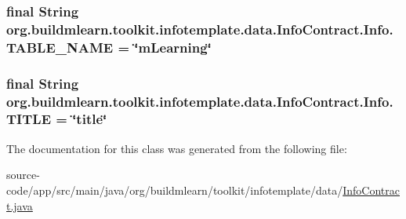 \subsubsection[{\texorpdfstring{T\+A\+B\+L\+E\+\_\+\+N\+A\+ME}{TABLE_NAME}}]{\setlength{\rightskip}{0pt plus 5cm}final String org.\+buildmlearn.\+toolkit.\+infotemplate.\+data.\+Info\+Contract.\+Info.\+T\+A\+B\+L\+E\+\_\+\+N\+A\+ME = \char`\"{}m\+Learning\char`\"{}\hspace{0.3cm}{\ttfamily [static]}}\hypertarget{classorg_1_1buildmlearn_1_1toolkit_1_1infotemplate_1_1data_1_1InfoContract_1_1Info_a5a7117b4841ab918cb9bbd92b3ce8e09}{}\label{classorg_1_1buildmlearn_1_1toolkit_1_1infotemplate_1_1data_1_1InfoContract_1_1Info_a5a7117b4841ab918cb9bbd92b3ce8e09}
\subsubsection[{\texorpdfstring{T\+I\+T\+LE}{TITLE}}]{\setlength{\rightskip}{0pt plus 5cm}final String org.\+buildmlearn.\+toolkit.\+infotemplate.\+data.\+Info\+Contract.\+Info.\+T\+I\+T\+LE = \char`\"{}title\char`\"{}\hspace{0.3cm}{\ttfamily [static]}}\hypertarget{classorg_1_1buildmlearn_1_1toolkit_1_1infotemplate_1_1data_1_1InfoContract_1_1Info_a1fe7ada37ca14f0968fba9d37dd638a4}{}\label{classorg_1_1buildmlearn_1_1toolkit_1_1infotemplate_1_1data_1_1InfoContract_1_1Info_a1fe7ada37ca14f0968fba9d37dd638a4}


The documentation for this class was generated from the following file\+:\begin{DoxyCompactItemize}
\item 
source-\/code/app/src/main/java/org/buildmlearn/toolkit/infotemplate/data/\hyperlink{InfoContract_8java}{Info\+Contract.\+java}\end{DoxyCompactItemize}
